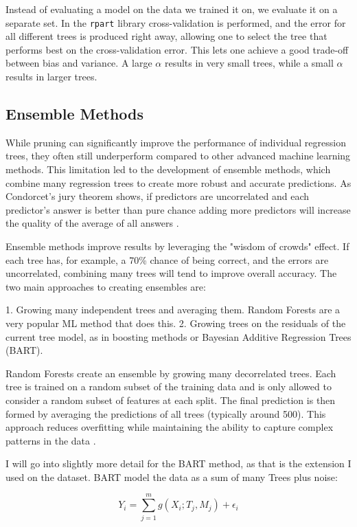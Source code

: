 \documentclass[12pt]{article}
\begin{document}
Instead of evaluating a model on the data we trained it on, we evaluate it on a separate set. In the \texttt{rpart} library cross-validation is performed, and the error for all different trees is produced right away, allowing one to select the tree that performs best on the cross-validation error. This lets one achieve a good trade-off between bias and variance. A large $\alpha$ results in very small trees, while a small $\alpha$ results in larger trees.


\subsection{Ensemble Methods}
While pruning can significantly improve the performance of individual regression trees, they often still underperform compared to other advanced machine learning methods. This limitation led to the development of ensemble methods, which combine many regression trees to create more robust and accurate predictions. As Condorcet's jury theorem shows, if predictors are uncorrelated and each predictor's answer is better than pure chance adding more predictors will increase the quality of the average of all answers \citep{condorcet1785}.

Ensemble methods improve results by leveraging the "wisdom of crowds" effect. If each tree has, for example, a 70\% chance of being correct, and the errors are uncorrelated, combining many trees will tend to improve overall accuracy. The two main approaches to creating ensembles are:

1. Growing many independent trees and averaging them. Random Forests are a very popular ML method that does this.
2. Growing trees on the residuals of the current tree model, as in boosting methods or Bayesian Additive Regression Trees (BART).

Random Forests create an ensemble by growing many decorrelated trees. Each tree is trained on a random subset of the training data and is only allowed to consider a random subset of features at each split. The final prediction is then formed by averaging the predictions of all trees (typically around 500). This approach reduces overfitting while maintaining the ability to capture complex patterns in the data \citep{biau2016}.

I will go into slightly more detail for the BART method, as that is the extension I used on the dataset. BART model the data as a sum of many Trees plus noise:

\begin{equation}
    Y_i = \sum_{j=1}^{m} g(X_i; T_j, M_j) + \epsilon_i
\end{equation}
\end{document}
